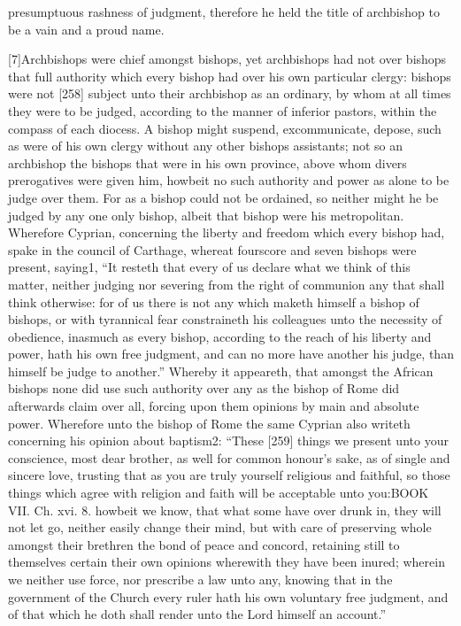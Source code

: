 presumptuous rashness of judgment, therefore he held the title of archbishop to be a vain and a proud name.

[7]Archbishops were chief amongst bishops, yet archbishops had not over bishops that full authority which every bishop had over his own particular clergy: bishops were not [258] subject unto their archbishop as an ordinary, by whom at all times they were to be judged, according to the manner of inferior pastors, within the compass of each diocess. A bishop might suspend, excommunicate, depose, such as were of his own clergy without any other bishops assistants; not so an archbishop the bishops that were in his own province, above whom divers prerogatives were given him, howbeit no such authority and power as alone to be judge over them. For as a bishop could not be ordained, so neither might he be judged by any one only bishop, albeit that bishop were his metropolitan. Wherefore Cyprian, concerning the liberty and freedom which every bishop had, spake in the council of Carthage, whereat fourscore and seven bishops were present, saying1, “It resteth that every of us declare what we think of this matter, neither judging nor severing from the right of communion any that shall think otherwise: for of us there is not any which maketh himself a bishop of bishops, or with tyrannical fear constraineth his colleagues unto the necessity of obedience, inasmuch as every bishop, according to the reach of his liberty and power, hath his own free judgment, and can no more have another his judge, than himself be judge to another.” Whereby it appeareth, that amongst the African bishops none did use such authority over any as the bishop of Rome did afterwards claim over all, forcing upon them opinions by main and absolute power. Wherefore unto the bishop of Rome the same Cyprian also writeth concerning his opinion about baptism2: “These [259] things we present unto your conscience, most dear brother, as well for common honour’s sake, as of single and sincere love, trusting that as you are truly yourself religious and faithful, so those things which agree with religion and faith will be acceptable unto you:BOOK VII. Ch. xvi. 8. howbeit we know, that what some have over drunk in, they will not let go, neither easily change their mind, but with care of preserving whole amongst their brethren the bond of peace and concord, retaining still to themselves certain their own opinions wherewith they have been inured; wherein we neither use force, nor prescribe a law unto any, knowing that in the government of the Church every ruler hath his own voluntary free judgment, and of that which he doth shall render unto the Lord himself an account.”

